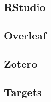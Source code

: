 \documentclass[12pt]{article}
\begin{document}
\subsection{RStudio}
\subsection{Overleaf}
\subsection{Zotero}
\subsection{Targets}




% 

% 
\end{document}
